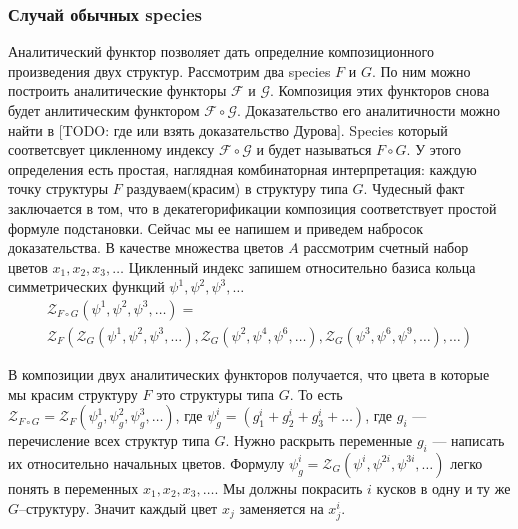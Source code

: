 \subsubsection{Случай обычных species}
Аналитический функтор позволяет дать определние композиционного произведения
двух структур. Рассмотрим два species $F$ и $G$. По ним можно построить
аналитические функторы $\mathcal F$ и $\mathcal G$. Композиция этих функторов
снова будет анлитическим функтором $\mathcal F \circ \mathcal G$. Доказательство
его аналитичности можно найти в [TODO: где или взять доказательство Дурова].
Species который соответсвует цикленному индексу $\mathcal F \circ \mathcal G$ и
будет называться $F \circ G$. У этого определения есть простая, наглядная
комбинаторная интерпретация: каждую точку структуры $F$ раздуваем(красим) в
структуру типа $G$. Чудесный факт заключается в том, что в декатегорификации
композиция соответствует простой формуле подстановки. Сейчас мы ее напишем и
приведем набросок доказательства. В качестве множества цветов $A$ рассмотрим
счетный набор цветов $x_1, x_2, x_3, \dots$ Цикленный индекс запишем
относительно базиса кольца симметрических функций $\psi^1, \psi^2, \psi^3, \dots$
\begin{multline}
\label{eq:zfg}
	\mathcal Z_{F \circ G} (\psi^1, \psi^2, \psi^3, \dots) = \\
	\mathcal Z_F(
		\mathcal Z_G(\psi^1, \psi^2, \psi^3, \dots),
		\mathcal Z_G(\psi^2, \psi^4, \psi^6, \dots),
		\mathcal Z_G(\psi^3, \psi^6, \psi^9, \dots),
		\dots
	)
\end{multline}

В композиции двух аналитических функторов получается, что цвета в которые мы
красим структуру $F$ это структуры типа $G$. То есть $\mathcal Z_{F \circ G} =
\mathcal Z_F(\psi_g^1, \psi_g^2, \psi_g^3, \dots)$, где $\psi_g^i = (g_1^i +
g_2^i + g_3^i + \dots)$, где $g_i$ --- перечисление всех структур типа $G$.
Нужно раскрыть переменные $g_i $ --- написать их относительно начальных цветов.
Формулу $\psi_g^i = \mathcal Z_G(\psi^i, \psi^{2i}, \psi^{3i}, \dots)$ легко
понять в переменных $x_1, x_2, x_3, \dots$. Мы должны покрасить $i$ кусков в
одну и ту же $G$--структуру. Значит каждый цвет $x_j$ заменяется на $x_j^i$.

